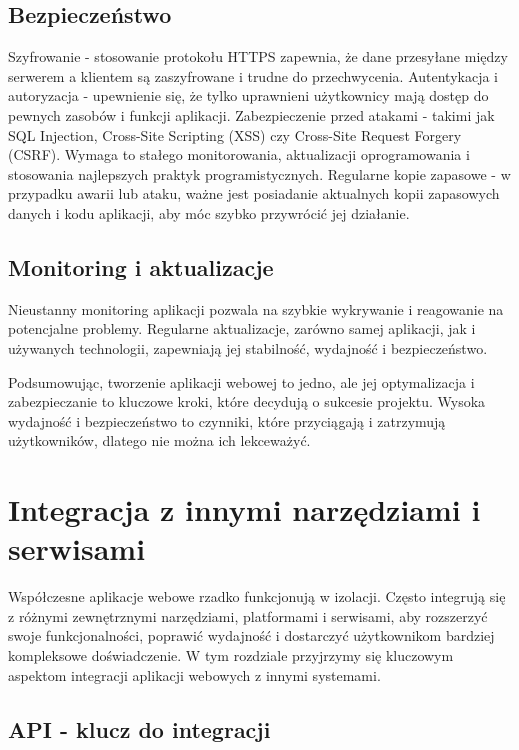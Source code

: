 \subsection{Bezpieczeństwo}

Szyfrowanie - stosowanie protokołu HTTPS zapewnia, że dane przesyłane między serwerem a klientem są zaszyfrowane i trudne do przechwycenia.
Autentykacja i autoryzacja - upewnienie się, że tylko uprawnieni użytkownicy mają dostęp do pewnych zasobów i funkcji aplikacji.
Zabezpieczenie przed atakami - takimi jak SQL Injection, Cross-Site Scripting (XSS) czy Cross-Site Request Forgery (CSRF). Wymaga to stałego monitorowania, aktualizacji oprogramowania i stosowania najlepszych praktyk programistycznych.
Regularne kopie zapasowe - w przypadku awarii lub ataku, ważne jest posiadanie aktualnych kopii zapasowych danych i kodu aplikacji, aby móc szybko przywrócić jej działanie.

\subsection{Monitoring i aktualizacje}

Nieustanny monitoring aplikacji pozwala na szybkie wykrywanie i reagowanie na potencjalne problemy. Regularne aktualizacje, zarówno samej aplikacji, jak i używanych technologii, zapewniają jej stabilność, wydajność i bezpieczeństwo.

Podsumowując, tworzenie aplikacji webowej to jedno, ale jej optymalizacja i zabezpieczanie to kluczowe kroki, które decydują o sukcesie projektu. Wysoka wydajność i bezpieczeństwo to czynniki, które przyciągają i zatrzymują użytkowników, dlatego nie można ich lekceważyć.

\section{Integracja z innymi narzędziami i serwisami}

Współczesne aplikacje webowe rzadko funkcjonują w izolacji. Często integrują się z różnymi zewnętrznymi narzędziami, platformami i serwisami, aby rozszerzyć swoje funkcjonalności, poprawić wydajność i dostarczyć użytkownikom bardziej kompleksowe doświadczenie. W tym rozdziale przyjrzymy się kluczowym aspektom integracji aplikacji webowych z innymi systemami.

\subsection{API - klucz do integracji}

